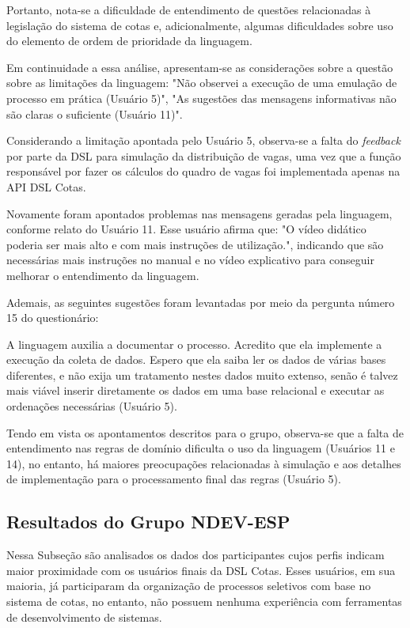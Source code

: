 Portanto, nota-se a dificuldade de entendimento de questões relacionadas à legislação do sistema de cotas e, adicionalmente, algumas dificuldades sobre uso do elemento de ordem de prioridade da linguagem. 

Em continuidade a essa análise, apresentam-se as considerações sobre a questão sobre as limitações da linguagem: "Não observei a execução de uma emulação de processo em prática (Usuário 5)", "As sugestões das mensagens informativas não são claras o suficiente (Usuário 11)".

Considerando a limitação apontada pelo Usuário 5, observa-se a falta do \textit{feedback} por parte da DSL para simulação da distribuição de vagas, uma vez que a função responsável por fazer os cálculos do quadro de vagas foi implementada apenas na API DSL Cotas. 

Novamente foram apontados problemas nas mensagens geradas pela linguagem, conforme relato do Usuário 11. Esse usuário afirma que: "O vídeo didático poderia ser mais alto e com mais instruções de utilização.", indicando que são necessárias mais instruções no manual e no vídeo explicativo para conseguir melhorar o entendimento da linguagem. 

Ademais, as seguintes sugestões foram levantadas por meio da pergunta número 15 do questionário:

\begin{citacao}
A linguagem auxilia a documentar o processo. Acredito que ela implemente a execução da coleta de dados. Espero que ela saiba ler os dados de várias bases diferentes, e não exija um tratamento nestes dados muito extenso, senão é talvez mais viável inserir diretamente os dados em uma base relacional e executar as ordenações necessárias (Usuário 5).
\end{citacao}

\newpage
Tendo em vista os apontamentos descritos para o grupo, observa-se que a falta de entendimento nas regras de domínio dificulta o uso da linguagem (Usuários 11 e 14), no entanto, há maiores preocupações relacionadas à simulação e aos detalhes de implementação para o processamento final das regras (Usuário 5).

\newpage
\subsection{Resultados do Grupo NDEV-ESP}
\label{subsec:ndevesp}

Nessa Subseção são analisados os dados dos participantes cujos perfis indicam maior proximidade com os usuários finais da DSL Cotas. Esses usuários, em sua maioria, já participaram da organização de processos seletivos com base no sistema de cotas, no entanto, não possuem nenhuma experiência com ferramentas de desenvolvimento de sistemas.


